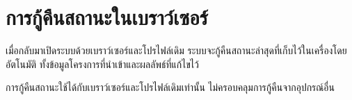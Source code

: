 \section{การกู้คืนสถานะในเบราว์เซอร์}

เมื่อกลับมาเปิดระบบด้วยเบราว์เซอร์และโปรไฟล์เดิม
ระบบจะกู้คืนสถานะล่าสุดที่เก็บไว้ในเครื่องโดยอัตโนมัติ
ทั้งข้อมูลโครงการที่นำเข้าและผลลัพธ์ที่แก้ไขไว้

\begin{caution}
การกู้คืนสถานะใช้ได้กับเบราว์เซอร์และโปรไฟล์เดิมเท่านั้น
ไม่ครอบคลุมการกู้คืนจากอุปกรณ์อื่น
\end{caution}


